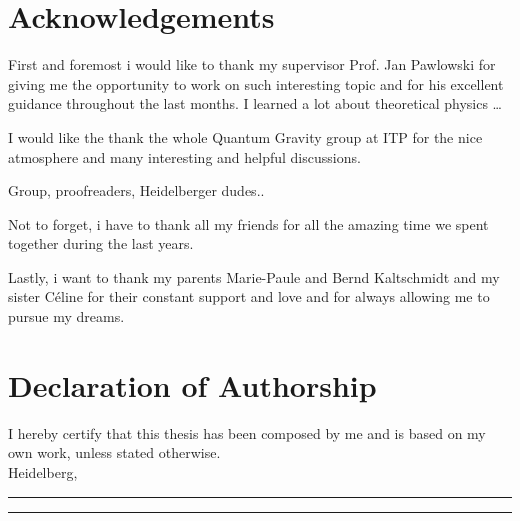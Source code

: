 \thispagestyle{plain}
\section*{Acknowledgements}
First and foremost i would like to thank my supervisor Prof. Jan Pawlowski for giving me the opportunity to work on such interesting topic and for his excellent guidance throughout the last months. I learned a lot about theoretical physics \dots

I would like the thank the whole Quantum Gravity group at ITP for the nice atmosphere and many interesting and  helpful discussions. 

Group, proofreaders, Heidelberger dudes..


Not to forget, i have to thank all my friends for all the amazing time we spent together during the last years. 

Lastly, i want to thank my parents Marie-Paule and Bernd Kaltschmidt and my sister C\'{e}line for their constant support and love and for always allowing me to pursue my dreams.  
 

\section*{Declaration of Authorship}
I hereby certify that this thesis has been composed by me and is based on my own work, unless stated otherwise.\\

Heidelberg, \rule{30mm}{.15mm} \hfill \rule{50mm}{.15mm} \par


